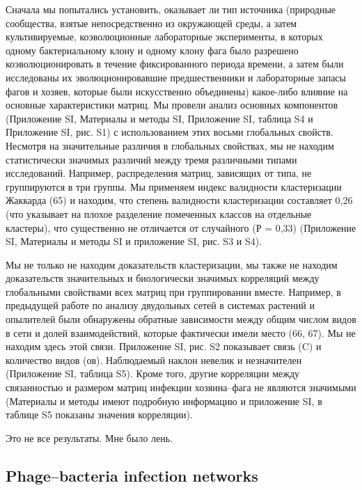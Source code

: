 \documentclass[a4paper,12pt]{article}
\begin{document}
    \par{Сначала мы попытались установить, оказывает ли тип источника (природные сообщества, взятые непосредственно из
    окружающей среды, а затем культивируемые, коэволюционные лабораторные эксперименты, в которых одному бактериальному
    клону и одному клону фага было разрешено коэволюционировать в течение фиксированного периода времени, а затем были
    исследованы их эволюционировавшие предшественники и лабораторные запасы фагов и хозяев, которые были искусственно
    объединены) какое-либо влияние на основные характеристики матриц. Мы провели анализ основных компонентов
    (Приложение SI, Материалы и методы SI, Приложение SI, таблица S4 и Приложение SI, рис. S1) с использованием этих
    восьми глобальных свойств. Несмотря на значительные различия в глобальных свойствах, мы не находим статистически
    значимых различий между тремя различными типами исследований. Например, распределения матриц, зависящих от типа, не
    группируются в три группы. Мы применяем индекс валидности кластеризации Жаккарда (65) и находим, что степень
    валидности кластеризации составляет 0,26 (что указывает на плохое разделение помеченных классов на отдельные
    кластеры), что существенно не отличается от случайного (Р = 0,33) (Приложение SI, Материалы и методы SI и
    приложение SI, рис. S3 и S4).}
    
    \par{Мы не только не находим доказательств кластеризации, мы также не находим доказательств значительных и
    биологически значимых корреляций между глобальными свойствами всех матриц при группировании вместе. Например, в
    предыдущей работе по анализу двудольных сетей в системах растений и опылителей были обнаружены обратные зависимости
    между общим числом видов в сети и долей взаимодействий, которые фактически имели место (66, 67). Мы не находим
    здесь этой связи. Приложение SI, рис. S2 показывает связь (C) и количество видов (ов). Наблюдаемый наклон невелик и
    незначителен (Приложение SI, таблица S5). Кроме того, другие корреляции между связанностью и размером матриц
    инфекции хозяина–фага не являются значимыми (Материалы и методы имеют подробную информацию и приложение SI, в
    таблице S5 показаны значения корреляции).}
    
    \par{{\Large Это не все результаты. Мне было лень.}}
   
\begin{center}
   \item \subsection{Phage–bacteria infection networks \cite{networks}}
\end{center}
\end{document}
